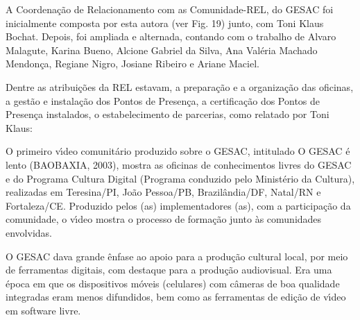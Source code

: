 \documentclass[
12pt,		%
openright,	%
twoside,  %
a4paper,			%
chapter=TITLE,		%
english,			%
french,				%
spanish,			%
brazil				%
]{USPSC-classe/USPSC}
\begin{document}
A Coordena\c{c}\~ao de Relacionamento com as Comunidade-REL, do GESAC foi inicialmente composta por esta autora (ver Fig. 19) junto, com Toni Klaus Bochat. Depois, foi ampliada e alternada, contando com o trabalho de Alvaro Malagute, Karina Bueno, Alcione Gabriel da Silva, Ana Val\'eria Machado Mendon\c{c}a, Regiane Nigro, Josiane Ribeiro e Ariane Maciel.









Dentre as atribui\c{c}\~oes da REL estavam,  a prepara\c{c}\~ao e a organiza\c{c}\~ao das oficinas, a gest\~ao e instala\c{c}\~ao dos Pontos de Presen\c{c}a, a certifica\c{c}\~ao dos Pontos de Presen\c{c}a instalados, o estabelecimento de parcerias, como relatado por Toni Klaus:










\noindent\begin{center}\mbox{\centering{}}\end{center}


O primeiro v\'{\i}deo comunit\'ario produzido sobre o GESAC, intitulado \textquotedbl  O GESAC \'e lento \textquotedbl   (BAOBAXIA, 2003),  mostra as oficinas de conhecimentos livres do GESAC e do Programa Cultura Digital (Programa conduzido pelo Minist\'erio da Cultura), realizadas em Teresina/PI, Jo\~ao Pessoa/PB, Brazil\^andia/DF, Natal/RN e Fortaleza/CE. Produzido pelos (as) implementadores (as), com a participa\c{c}\~ao da comunidade, o v\'{\i}deo mostra o processo de forma\c{c}\~ao junto \`as comunidades envolvidas.









O GESAC dava grande \^enfase ao apoio para a produ\c{c}\~ao cultural local, por meio de ferramentas digitais, com destaque para a produ\c{c}\~ao audiovisual. Era uma \'epoca em que os dispositivos m\'oveis (celulares) com c\^ameras de boa qualidade integradas eram menos difundidos, bem como as ferramentas de edi\c{c}\~ao de v\'{\i}deo em software livre.
\end{document}
